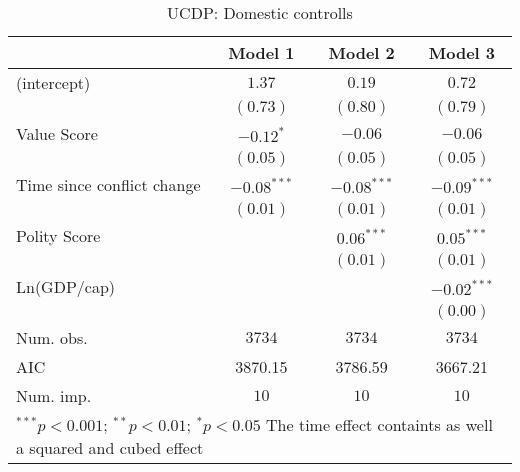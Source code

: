 
\begin{table}
\begin{center}
\begin{tabular}{l c c c}
\toprule
 & Model 1 & Model 2 & Model 3 \\
\midrule
(intercept)                & $1.37$        & $0.19$        & $0.72$        \\
                           & $(0.73)$      & $(0.80)$      & $(0.79)$      \\
Value Score                & $-0.12^{*}$   & $-0.06$       & $-0.06$       \\
                           & $(0.05)$      & $(0.05)$      & $(0.05)$      \\
Time since conflict change & $-0.08^{***}$ & $-0.08^{***}$ & $-0.09^{***}$ \\
                           & $(0.01)$      & $(0.01)$      & $(0.01)$      \\
Polity Score               &               & $0.06^{***}$  & $0.05^{***}$  \\
                           &               & $(0.01)$      & $(0.01)$      \\
Ln(GDP/cap)                &               &               & $-0.02^{***}$ \\
                           &               &               & $(0.00)$      \\
\midrule
Num. obs.                  & $3734$        & $3734$        & $3734$        \\
AIC                        & 3870.15       & 3786.59       & 3667.21       \\
Num. imp.                  & $10$          & $10$          & $10$          \\
\bottomrule
\multicolumn{4}{l}{\scriptsize{$^{***}p<0.001$; $^{**}p<0.01$; $^{*}p<0.05$ 
 The time effect containts as well a squared and cubed effect}}
\end{tabular}
\caption{UCDP: Domestic controlls}
\label{UCDP_1}
\end{center}
\end{table}
